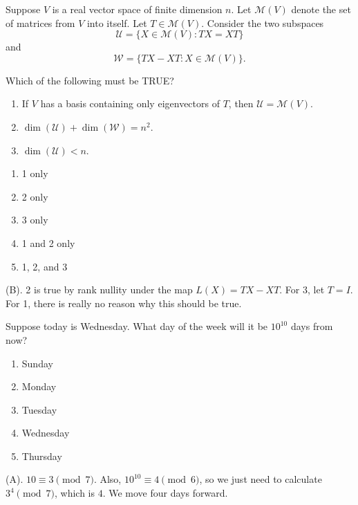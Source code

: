 \begin{exercise}
Suppose $V$ is a real vector space of finite dimension $n$. Let $\mathcal{M}(V)$ denote the set of matrices from $V$ into itself. Let $T\in\mathcal{M}(V)$. Consider the two subspaces
\[
\mathcal{U}=\{X\in\mathcal{M}(V):TX=XT\}
\]
and
\[
\mathcal{W}=\{TX-XT:X\in\mathcal{M}(V)\}.
\]

Which of the following must be TRUE?
\begin{enumerate}
    \item If $V$ has a basis containing only eigenvectors of $T$, then $\mathcal{U}=\mathcal{M}(V)$.
    \item $\dim(\mathcal{U})+\dim(\mathcal{W})=n^2$.
    \item $\dim(\mathcal{U})<n$.
\end{enumerate}

\begin{enumerate}[label=(\Alph*)]
    \item 1 only
    \item 2 only
    \item 3 only
    \item 1 and 2 only
    \item 1, 2, and 3
\end{enumerate}
\end{exercise}
\begin{solution}
(B). 2 is true by rank nullity under the map $L(X) = TX - XT$. For 3, let $T = I$. For 1, 
there is really no reason why this should be true.
\end{solution}

\begin{exercise}
Suppose today is Wednesday. What day of the week will it be $10^{10}$ days from now?

\begin{enumerate}[label=(\Alph*)]
    \item Sunday
    \item Monday
    \item Tuesday
    \item Wednesday
    \item Thursday
\end{enumerate}
\end{exercise}
\begin{solution}
(A). $10 \equiv 3 \pmod{7}$. Also, $10^{10} \equiv 4 \pmod{6}$, so we just need to calculate
$3^4 \pmod{7}$, which is $4$. We move four days forward.
\end{solution}


